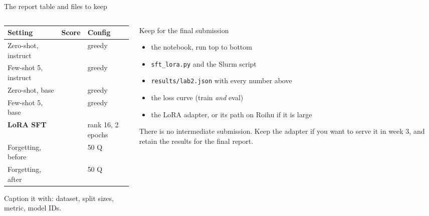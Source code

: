 \documentclass[aspectratio=169,10pt]{beamer}
\begin{document}
\begin{frame}{The report table and files to keep}
  \begin{columns}[T]
    \begin{column}{0.56\textwidth}
      \small
      \begin{tabular}{@{}L{2.9cm} C{1.3cm} L{2.2cm}@{}}
        \toprule
        \textbf{Setting} & \textbf{Score} & \textbf{Config}\\
        \midrule
        Zero-shot, instruct & & greedy\\
        Few-shot 5, instruct & & greedy\\
        Zero-shot, base & & greedy\\
        Few-shot 5, base & & greedy\\
        \midrule
        \textbf{LoRA SFT} & & rank 16, 2 epochs\\
        \midrule
        Forgetting, before & & 50 Q\\
        Forgetting, after & & 50 Q\\
        \bottomrule
      \end{tabular}
      \vspace{0.4em}

      \scriptsize Caption it with: dataset, split sizes, metric, model IDs.
    \end{column}
    \begin{column}{0.44\textwidth}
      \begin{block}{Keep for the final submission}
        \small
        \begin{itemize}
          \item the notebook, run top to bottom
          \item \texttt{sft\_lora.py} and the Slurm script
          \item \texttt{results/lab2.json} with every number above
          \item the loss curve (train \emph{and} eval)
          \item the LoRA adapter, or its path on Roihu if it is large
        \end{itemize}
      \end{block}
      \vspace{0.2em}
      \small
      There is no intermediate submission. Keep the adapter if you want to
      serve it in week 3, and retain the results for the final report.
    \end{column}
  \end{columns}
\end{frame}
\end{document}
